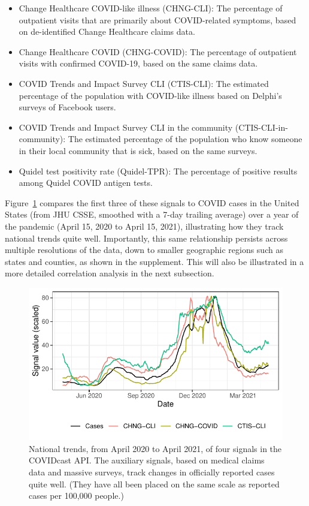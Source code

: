 \documentclass[9pt,twocolumn,twoside,lineno]{pnas-new}
\begin{document}
\begin{itemize}
\item Change Healthcare COVID-like illness (CHNG-CLI): The percentage of
  outpatient visits that are primarily about COVID-related symptoms, based on
  de-identified Change Healthcare claims data.
\item Change Healthcare COVID (CHNG-COVID): The percentage of outpatient visits
  with confirmed COVID-19, based on the same claims data.
\item COVID Trends and Impact Survey CLI (CTIS-CLI): The estimated percentage
  of the population with COVID-like illness based on Delphi's surveys of
  Facebook users.
\item COVID Trends and Impact Survey CLI in the community
  (CTIS-CLI-in-community): The estimated percentage of the population who know 
  someone in their local community that is sick, based on the same surveys.
\item Quidel test positivity rate (Quidel-TPR): The percentage of positive
  results among Quidel COVID antigen tests.  
\end{itemize}

Figure~\ref{fig:time_trends_national} compares the first three of these signals
to COVID cases in the United States (from JHU CSSE, smoothed with a 7-day
trailing average) over a year of the pandemic (April 15, 2020 to April 15,
2021), illustrating how they track national trends quite well.  Importantly, 
this same relationship persists across multiple resolutions of the data, down to
smaller geographic regions such as states and counties, as shown in the
supplement.  This will also be illustrated in a more detailed correlation 
analysis in the next subsection.   

\begin{figure}[t]
  \includegraphics[width=\columnwidth]{fig/time_trends_national.pdf}
  \caption{National trends, from April 2020 to April 2021, of four signals in 
    the COVIDcast API. The auxiliary signals, based on medical claims data and 
    massive surveys, track changes in officially reported cases quite
    well. (They have all been placed on the same scale as reported cases per 
    100,000 people.)}
  \label{fig:time_trends_national}
\end{figure}
\end{document}
